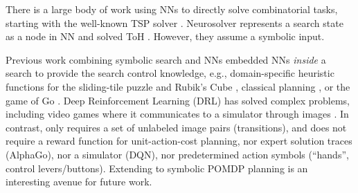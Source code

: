 There is a large body of work using NNs to directly solve combinatorial tasks,
starting with the well-known TSP solver \cite{hopfield1985neural}.
Neurosolver represents a search state as a node in NN 
and solved ToH \cite{bieszczad2015neurosolver}. %
However, they assume a symbolic input.
\begin{comment}
Previous work combining NNs and symbolic search algorithms embedded NNs {\it inside} a search algorithm
to provide search control knowledge \cite{alphago,ArfaeeZH11} %
In contrast, we use a NN-based SAE for symbol grounding, not for search control.
\end{comment}

Previous work combining symbolic search and NNs embedded NNs {\it inside} a search
to provide the search control knowledge,
e.g., domain-specific heuristic functions for
the sliding-tile puzzle and Rubik's Cube \cite{ArfaeeZH11},
classical planning \cite{SatzgerK13},
or the game of Go \cite{alphago}.
Deep Reinforcement Learning (DRL) has solved complex problems,
including video games where it communicates to a simulator through images \cite[DQN]{dqn}.
%
In contrast, \latentplanner only requires a set of unlabeled image pairs (transitions), and 
does not require a reward function for unit-action-cost planning,
nor expert solution traces (AlphaGo),
nor a  simulator (DQN), nor predetermined action symbols (``hands'', control levers/buttons).
Extending \latentplanner to symbolic POMDP planning is an interesting avenue for future work.

